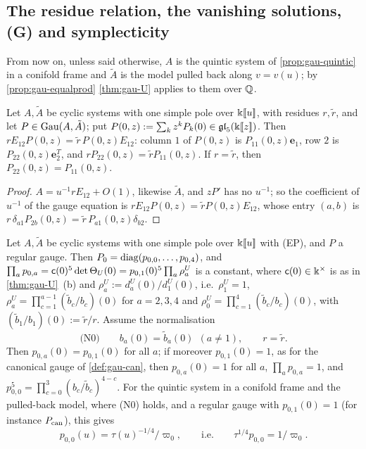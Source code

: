 
\subsection{The residue relation, the vanishing solutions, (G) and symplecticity}
\label{sec:gau-van}

From now on, unless said otherwise, $A$ is the quintic system of \cref{prop:gau-quintic} in a conifold frame and $\tilde A$ is the model pulled back along $v=v(u)$; by \cref{prop:gau-equalprod} \cref{thm:gau-U} applies to them over $\mathbb{Q}$.

\begin{lem}
\label{lem:gau-R1}
Let $A,\tilde A$ be cyclic systems with one simple pole over $\Bbbk[\![ u ]\!]$, with residues $r,\tilde r$, and let $P\in\operatorname{Gau}(A,\tilde A)$; put $P(0,z):=\sum_kz^kP_k(0)\in\mathfrak{gl}_5(\Bbbk[\![ z ]\!])$. Then $rE_{12}P(0,z)=\tilde r\,P(0,z)E_{12}$: column $1$ of $P(0,z)$ is $P_{11}(0,z)\mathbf e_1$, row $2$ is $P_{22}(0,z)\mathbf e_2^T$, and $rP_{22}(0,z)=\tilde rP_{11}(0,z)$. If $r=\tilde r$, then $P_{22}(0,z)=P_{11}(0,z)$.
\end{lem}

\begin{proof}
$A=u^{-1}rE_{12}+O(1)$, likewise $\tilde A$, and $zP'$ has no $u^{-1}$; so the coefficient of $u^{-1}$ of the gauge equation is $rE_{12}P(0,z)=\tilde rP(0,z)E_{12}$, whose entry $(a,b)$ is $r\,\delta_{a1}P_{2b}(0,z)=\tilde r\,P_{a1}(0,z)\delta_{b2}$.
\end{proof}

\begin{lem}
\label{lem:gau-diag}
Let $A,\tilde A$ be cyclic systems with one simple pole over $\Bbbk[\![ u ]\!]$ with (EP), and $P$ a regular gauge. Then $P_0=\operatorname{diag}(p_{0,0},\dots,p_{0,4})$, and $\prod_ap_{0,a}=\mathsf{c}(0)^5\det\Theta_U(0)=p_{0,1}(0)^5\prod_a\rho^U_a$ is a constant, where $\mathsf{c}(0)\in\Bbbk^\times$ is as in \cref{thm:gau-U}~(b) and $\rho^U_a:=d^U_a(0)/d^U_1(0)$, i.e.\ $\rho^U_1=1$, $\rho^U_a=\prod_{c=1}^{a-1}(\tilde b_c/b_c)(0)$ for $a=2,3,4$ and $\rho^U_0=\prod_{c=1}^4(\tilde b_c/b_c)(0)$, with $(\tilde b_1/b_1)(0):=\tilde r/r$. Assume the normalisation
\[
\text{(N0)}\qquad b_a(0)=\tilde b_a(0)\ \ (a\neq1),\qquad r=\tilde r .
\]
Then $p_{0,a}(0)=p_{0,1}(0)$ for all $a$; if moreover $p_{0,1}(0)=1$, as for the canonical gauge of \cref{def:gau-can}, then $p_{0,a}(0)=1$ for all $a$, $\prod_ap_{0,a}=1$, and $p_{0,0}^5=\prod_{c=0}^3(b_c/\tilde b_c)^{4-c}$. For the quintic system in a conifold frame and the pulled-back model, where (N0) holds, and a regular gauge with $p_{0,1}(0)=1$ (for instance $P_{\mathrm{can}}$), this gives
\[
p_{0,0}(u)=\tau(u)^{-1/4}/\varpi_0,\qquad\text{i.e.}\qquad \tau^{1/4}p_{0,0}=1/\varpi_0 .
\]
\end{lem}

